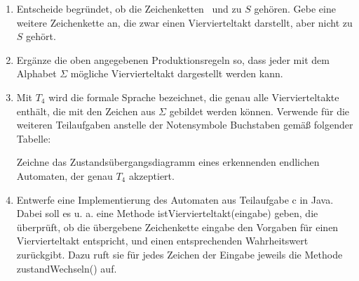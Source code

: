 \documentclass{lehramt-informatik-aufgabe}
\begin{document}
\begin{enumerate}


\item Entscheide begründet, ob die Zeichenketten
\quarterNote\quarterNote\quarterNote\quarterNote\ und
\quarterNote\halfNote\quarterNote{} zu $S$ gehören. Gebe eine weitere
Zeichenkette an, die zwar einen Viervierteltakt darstellt, aber nicht zu
$S$ gehört.


\item Ergänze die oben angegebenen Produktionsregeln so, dass jeder mit
dem Alphabet $\Sigma$ mögliche Viervierteltakt dargestellt werden kann.


\item Mit $T_4$ wird die formale Sprache bezeichnet, die genau alle
Viervierteltakte enthält, die mit den Zeichen aus $\Sigma$ gebildet werden
können. Verwende für die weiteren Teilaufgaben anstelle der Notensymbole
Buchstaben gemäß folgender Tabelle:

Zeichne das Zustandsübergangsdiagramm eines erkennenden endlichen
Automaten, der genau $T_4$ akzeptiert.


\item Entwerfe eine Implementierung des Automaten aus Teilaufgabe c in
Java. Dabei soll es u. a. eine Methode istViervierteltakt(eingabe)
geben, die überprüft, ob die übergebene Zeichenkette eingabe den
Vorgaben für einen Viervierteltakt entspricht, und einen entsprechenden
Wahrheitswert zurückgibt. Dazu ruft sie für jedes Zeichen der Eingabe
jeweils die Methode zustandWechseln() auf.
\end{enumerate}
\end{document}
